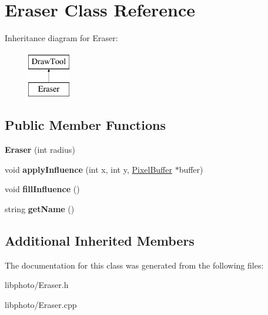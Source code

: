 \hypertarget{classEraser}{\section{Eraser Class Reference}
\label{classEraser}
}
Inheritance diagram for Eraser\-:\begin{figure}[H]
\begin{center}
\leavevmode
\includegraphics[height=2.000000cm]{classEraser}
\end{center}
\end{figure}
\subsection*{Public Member Functions}
\begin{DoxyCompactItemize}
\item 
\hypertarget{classEraser_a60abccb4522452a4cdfb714eafbc9c16}{{\bfseries Eraser} (int radius)}\label{classEraser_a60abccb4522452a4cdfb714eafbc9c16}

\item 
\hypertarget{classEraser_a195eeec6843317ee33e0e51fccb3daff}{void {\bfseries apply\-Influence} (int x, int y, \hyperlink{classPixelBuffer}{Pixel\-Buffer} $\ast$buffer)}\label{classEraser_a195eeec6843317ee33e0e51fccb3daff}

\item 
\hypertarget{classEraser_ad718ebd5796e0a83dbd94aa4f0ce2921}{void {\bfseries fill\-Influence} ()}\label{classEraser_ad718ebd5796e0a83dbd94aa4f0ce2921}

\item 
\hypertarget{classEraser_ac83b9aa44690af5d4043bce157a8ff3d}{string {\bfseries get\-Name} ()}\label{classEraser_ac83b9aa44690af5d4043bce157a8ff3d}

\end{DoxyCompactItemize}
\subsection*{Additional Inherited Members}


The documentation for this class was generated from the following files\-:\begin{DoxyCompactItemize}
\item 
libphoto/Eraser.\-h\item 
libphoto/Eraser.\-cpp\end{DoxyCompactItemize}
